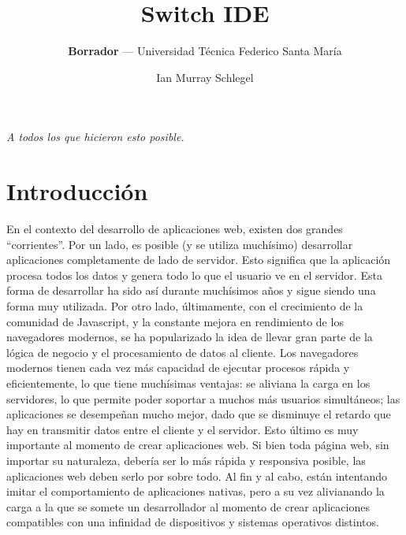 \documentclass[12pt,titlepage,]{article}
\title{Switch IDE}
\author{\textbf{Borrador} --- Universidad Técnica Federico Santa María}
\date{Ian Murray Schlegel}
\begin{document}
\maketitle


\begin{flushright}
\vspace*{\fill}

\textit{A todos los que hicieron esto posible.}

\vspace*{\fill}
\end{flushright}

\newpage
\hypersetup{linkcolor=black} \tableofcontents

\newpage

\section{Introducción}


En el contexto del desarrollo de aplicaciones web, existen dos grandes
``corrientes''. Por un lado, es posible (y se utiliza muchísimo)
desarrollar aplicaciones completamente de lado de servidor. Esto
significa que la aplicación procesa todos los datos y genera todo lo que
el usuario ve en el servidor. Esta forma de desarrollar ha sido así
durante muchísimos años y sigue siendo una forma muy utilizada. Por otro
lado, últimamente, con el crecimiento de la comunidad de Javascript, y
la constante mejora en rendimiento de los navegadores modernos, se ha
popularizado la idea de llevar gran parte de la lógica de negocio y el
procesamiento de datos al cliente. Los navegadores modernos tienen cada
vez más capacidad de ejecutar procesos rápida y eficientemente, lo que
tiene muchísimas ventajas: se aliviana la carga en los servidores, lo
que permite poder soportar a muchos más usuarios simultáneos; las
aplicaciones se desempeñan mucho mejor, dado que se disminuye el retardo
que hay en transmitir datos entre el cliente y el servidor. Esto último
es muy importante al momento de crear aplicaciones web. Si bien toda
página web, sin importar su naturaleza, debería ser lo más rápida y
responsiva posible, las aplicaciones web deben serlo por sobre todo. Al
fin y al cabo, están intentando imitar el comportamiento de aplicaciones
nativas, pero a su vez alivianando la carga a la que se somete un
desarrollador al momento de crear aplicaciones compatibles con una
infinidad de dispositivos y sistemas operativos distintos.
\end{document}
